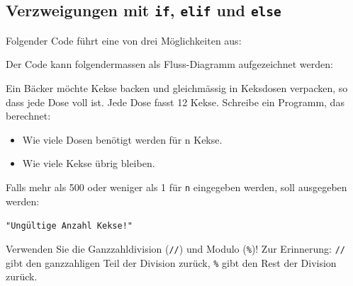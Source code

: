 \subsection{Verzweigungen mit \texorpdfstring{\lstinline|if|}{if}, \texorpdfstring{\lstinline|elif|}{elif} und \texorpdfstring{\lstinline|else|}{else}}
\begin{myexample}
Folgender Code führt eine von drei Möglichkeiten aus:


Der Code kann folgendermassen als Fluss-Diagramm aufgezeichnet werden:

\begin{figure}[H]
	\centering
	
\end{figure}
\end{myexample}

\begin{myexercise}
	Ein Bäcker möchte Kekse backen und gleichmässig in Keksdosen verpacken, so dass jede Dose voll ist. Jede Dose fasst 12 Kekse. Schreibe ein Programm, das berechnet:

	\begin{itemize}
		\item Wie viele Dosen benötigt werden für n Kekse.
		\item Wie viele Kekse übrig bleiben.
	\end{itemize}

	Falls mehr als 500 oder weniger als 1 für \texttt{n} eingegeben werden, soll ausgegeben werden:

	\lstinline|"Ungültige Anzahl Kekse!"|

	Verwenden Sie die Ganzzahldivision (\lstinline|//|) und Modulo (\lstinline|%|)! Zur Erinnerung: \lstinline|//| gibt den ganzzahligen Teil der Division zurück, \lstinline|%| gibt den Rest der Division zurück.

	\begin{myanswer}
		
	\end{myanswer}
\end{myexercise}


